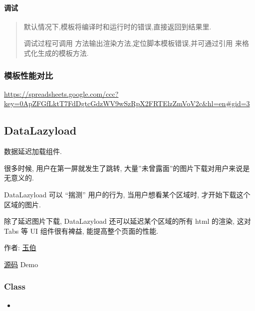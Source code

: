 \documentclass[letterpaper,10pt,english]{sphinxmanual}
\begin{document}
\paragraph{调试}
\label{api/component/template/index:id8}\begin{quote}

默认情况下,模板将编译时和运行时的错误,直接返回到结果里.

调试过程可调用  方法输出渲染方法,定位脚本模板错误,并可通过引用  来格式化生成的模板方法.
\end{quote}


\subsubsection{模板性能对比}
\label{api/component/template/index:id9}
\href{https://spreadsheets.google.com/ccc?key=0ApZFGfLktT7FdDgtcGdzWV9wSzRpX2FRTElzZmVoV2c\&hl=en\#gid=3}{https://spreadsheets.google.com/ccc?key=0ApZFGfLktT7FdDgtcGdzWV9wSzRpX2FRTElzZmVoV2c\&hl=en\#gid=3}
\label{api/component/datalazyload/index:module-DataLazyload}

\subsection{DataLazyload}
\label{api/component/datalazyload/index:datalazyload}\label{api/component/datalazyload/index::doc}
\begin{DUlineblock}{0em}
\item[] 数据延迟加载组件.
\item[] 很多时候, 用户在第一屏就发生了跳转, 大量''未曾露面''的图片下载对用户来说是无意义的.
\item[] DataLazyload 可以 ``揣测'' 用户的行为, 当用户想看某个区域时, 才开始下载这个区域的图片.
\item[] 除了延迟图片下载, DataLazyload 还可以延迟某个区域的所有 html 的渲染, 这对 Tabs 等 UI 组件很有裨益, 能提高整个页面的性能.
\item[] 作者: \href{mailto:lifesinger@gmail.com}{玉伯}
\item[] \href{https://github.com/kissyteam/kissy/tree/master/src/datalazyload/impl.js}{源码}  \textbar{} Demo
\end{DUlineblock}


\subsubsection{Class}
\label{api/component/datalazyload/index:class}\begin{itemize}
\item {}
{\hyperref[api/component/datalazyload/index:DataLazyload.DataLazyload]{}}

\end{itemize}
\end{document}
